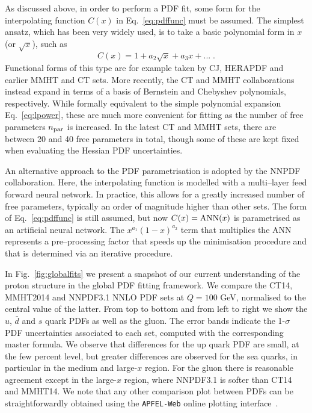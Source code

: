 As discussed above, in order to perform a  PDF fit, some form for the interpolating function $C(x)$ in Eq.~\eqref{eq:pdffunc}
must be assumed.
%
The simplest ansatz, which has been very widely used, is to take a basic polynomial form in $x$ (or $\sqrt{x}$), such as
\begin{equation}\label{eq:lpower}
C(x)=1+a_2\sqrt{x}+a_3 x+...\;.
\end{equation}
Functional forms of this type are for example taken by CJ, HERAPDF and earlier MMHT and CT sets. More recently, the CT and MMHT collaborations instead expand in terms of a basis of  Bernstein and Chebyshev polynomials, respectively.
%
While formally equivalent to the simple polynomial expansion
Eq.~\eqref{eq:lpower}, these are much more convenient for fitting as the number of free parameters $n_{\rm par}$ is increased.
%
In the latest CT and MMHT sets, there are between 20 and 40 free parameters in total,
though some of these are kept fixed when evaluating the
Hessian PDF uncertainties.

An alternative approach to the PDF parametrisation is adopted
by the NNPDF collaboration. Here, the interpolating function is modelled with a multi--layer feed forward neural network.
%
In practice, this allows for a greatly increased number of free parameters, typically an order of magnitude higher than other sets.
%
The form of Eq.~\eqref{eq:pdffunc} is still assumed, but
now $C(x)={\rm ANN}(x)$ is parametrised as an artificial
neural network.
%
The $x^{a_1}(1-x)^{a_2}$ term that multiplies the ANN represents
a pre--processing factor that speeds up the minimisation procedure
and that is determined via an iterative procedure.

In Fig.~\ref{fig:globalfits}
we present a snapshot of our current understanding
of the proton structure in the global PDF fitting framework.
%
We compare the CT14, MMHT2014
  and NNPDF3.1 NNLO PDF sets at $Q=100$ GeV, normalised
  to the central value of the latter.
  From top to bottom and from left to right we show the
  $u$, $\bar{d}$ and $s$ quark PDFs as well as the gluon.
  The error bands indicate the 1-$\sigma$ PDF uncertainties
  associated to each set, computed with the corresponding
  master formula.
  We observe that differences for the up quark PDF
  are small, at the few percent level, but greater differences
  are observed for the sea quarks, in particular
  in the medium and large-$x$ region.
  For the gluon there is reasonable agreement except
  in the large-$x$ region, where NNPDF3.1 is softer than
  CT14 and MMHT14.
%
We note that any other comparison plot between PDFs can be straightforwardly
obtained using the {\tt APFEL-Web} online plotting interface~\cite{Carrazza:2014gfa}.

